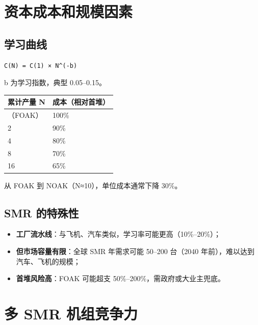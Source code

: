 \documentclass[
  UTF8,
  scheme=plain,
  fontsize=10pt,
  openany
]{ctexbook}
\begin{document}
\section{资本成本和规模因素}\label{ux8d44ux672cux6210ux672cux548cux89c4ux6a21ux56e0ux7d20}

\subsection{学习曲线}\label{ux5b66ux4e60ux66f2ux7ebf}

\begin{verbatim}C(N) = C(1) × N^(-b)\end{verbatim}

b 为学习指数，典型 0.05--0.15。

{\def\LTcaptype{none} %
\begin{longtable}[]{@{}ll@{}}
\toprule\noalign{}
累计产量 N & 成本（相对首堆） \\
\midrule\noalign{}
\endhead
\bottomrule\noalign{}
\endlastfoot
1（FOAK） & 100\% \\
2 & 90\% \\
4 & 80\% \\
8 & 70\% \\
16 & 65\% \\
\end{longtable}
}

从 FOAK 到 NOAK（N≈10），单位成本通常下降 30\%。

\subsection{SMR 的特殊性}\label{smr-ux7684ux7279ux6b8aux6027}

\begin{itemize}
\tightlist
\item
  \textbf{工厂流水线}：与飞机、汽车类似，学习率可能更高（10\%--20\%）；
\item
  \textbf{但市场容量有限}：全球 SMR 年需求可能 50--200 台（2040
  年前），难以达到汽车、飞机的规模；
\item
  \textbf{首堆风险高}：FOAK 可能超支 50\%--200\%，需政府或大业主兜底。
\end{itemize}

\section{多 SMR
机组竞争力}\label{ux591a-smr-ux673aux7ec4ux7adeux4e89ux529b}
\end{document}

